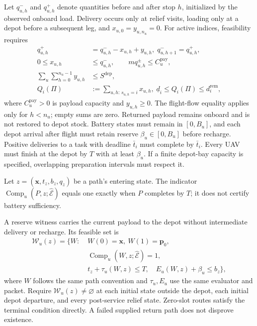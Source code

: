 Let $q_{u,h}^{-}$ and $q_{u,h}^{+}$ denote quantities before and after
stop $h$, initialized by the observed onboard load. Delivery occurs only
at relief visits, loading only at a depot before a subsequent leg, and
$x_{u,0}=y_{u,n_u}=0$. For active indices, feasibility requires
\begin{align}
q_{u,h}^{+}&=q_{u,h}^{-}-x_{u,h}+y_{u,h},
\; q_{u,h+1}^{-}=q_{u,h}^{+},
\label{eq:payload_flow}\\
0\le x_{u,h}&\le q_{u,h}^{-},\qquad
m q_{u,h}^{\pm}\le C_u^{\mathrm{pay}},
\label{eq:payload_capacity}\\
\sum_u\sum_{h=0}^{n_u-1}y_{u,h}&\le S^{\mathrm{dep}},
\label{eq:inventory}\\
Q_i(\Pi)&:=\sum_{u,h:\,s_{u,h}=i}x_{u,h},
\; \underline d_i\le Q_i(\Pi)\le d_i^{\mathrm{rem}},
\label{eq:service_bounds}
\end{align}
where $C_u^{\mathrm{pay}}>0$ is payload capacity and $y_{u,h}\ge0$.
The flight-flow equality applies only for $h<n_u$; empty sums are zero.
Returned payload remains onboard and is not restored to depot stock.
Battery states must remain in $[0,B_u]$, and each depot arrival after
flight must retain reserve $\beta_u\in[0,B_u]$ before recharge.
Positive deliveries to a task with deadline $\bar t_i$ must complete by
$\bar t_i$. Every UAV must finish at the depot by $T$ with at least
$\beta_u$. If a finite depot-bay capacity is specified, overlapping
preparation intervals must respect it.

Let $z=(\mathbf x,t_z,b_z,q_z)$ be a path's entering state.
The indicator $\operatorname{Comp}_u(P,z;\widehat{\mathcal E})$ equals one
exactly when $P$ completes by $T$; it does not certify battery sufficiency.

A reserve witness carries the current payload to the
depot without intermediate delivery or recharge. Its feasible set is
\begin{equation}
\begin{split}
\mathscr W_u(z)=\{W:\;&W(0)=\mathbf x,\ W(1)=\mathbf p_0,\\
&\operatorname{Comp}_u(W,z;\widehat{\mathcal E})=1,\\
&t_z+\tau_u(W,z)\le T,\quad
E_u(W,z)+\beta_u\le b_z\},
\end{split}
\label{eq:reserve_witness_set}
\end{equation}
where $W$ follows the same path convention and $\tau_u,E_u$ use the same
evaluator and packet. Require $\mathscr W_u(z)\ne\varnothing$ at each
initial state outside the depot, each initial depot departure, and every
post-service relief state. Zero-slot routes satisfy the terminal condition
directly. A failed supplied return path does not disprove existence.

